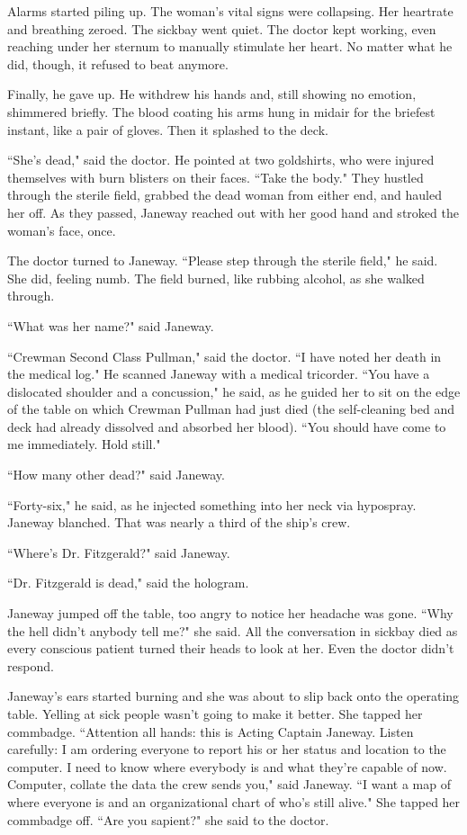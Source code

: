 \documentclass[twoside,letterpaper,12pt]{memoir}
\begin{document}
Alarms started piling up. The woman's vital signs were collapsing. Her heartrate and breathing zeroed. The sickbay went quiet. The doctor kept working, even reaching under her sternum to manually stimulate her heart. No matter what he did, though, it refused to beat anymore.

Finally, he gave up. He withdrew his hands and, still showing no emotion, shimmered briefly. The blood coating his arms hung in midair for the briefest instant, like a pair of gloves. Then it splashed to the deck.

``She's dead," said the doctor. He pointed at two goldshirts, who were injured themselves with burn blisters on their faces. ``Take the body." They hustled through the sterile field, grabbed the dead woman from either end, and hauled her off. As they passed, Janeway reached out with her good hand and stroked the woman's face, once.

The doctor turned to Janeway. ``Please step through the sterile field," he said. She did, feeling numb. The field burned, like rubbing alcohol, as she walked through.

``What was her name?" said Janeway.

``Crewman Second Class Pullman," said the doctor. ``I have noted her death in the medical log." He scanned Janeway with a medical tricorder. ``You have a dislocated shoulder and a concussion," he said, as he guided her to sit on the edge of the table on which Crewman Pullman had just died (the self-cleaning bed and deck had already dissolved and absorbed her blood). ``You should have come to me immediately. Hold still."

``How many other dead?" said Janeway.

``Forty-six," he said, as he injected something into her neck via hypospray. Janeway blanched. That was nearly a third of the ship's crew.

``Where's Dr. Fitzgerald?" said Janeway.

``Dr. Fitzgerald is dead," said the hologram.

Janeway jumped off the table, too angry to notice her headache was gone. ``Why the hell didn't anybody tell me?" she said. All the conversation in sickbay died as every conscious patient turned their heads to look at her. Even the doctor didn't respond.

Janeway's ears started burning and she was about to slip back onto the operating table. Yelling at sick people wasn't going to make it better. She tapped her commbadge. ``Attention all hands: this is Acting Captain Janeway. Listen carefully: I am ordering everyone to report his or her status and location to the computer. I need to know where everybody is and what they're capable of now. Computer, collate the data the crew sends you," said Janeway. ``I want a map of where everyone is and an organizational chart of who's still alive." She tapped her commbadge off. ``Are you sapient?" she said to the doctor.
\end{document}
